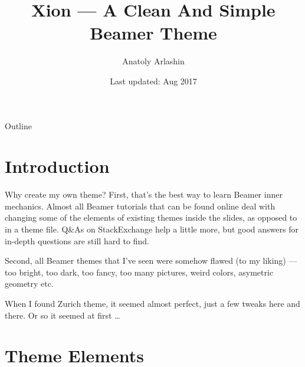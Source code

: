 \documentclass[11pt,c]{beamer}
\title{Xion --- A Clean And Simple Beamer Theme}
\author{Anatoly Arlashin}
\date{\footnotesize Last updated: Aug 2017}
\begin{document}
\begin{frame}[plain] %
	\titlepage
\end{frame}

\begin{frame}{Outline}
	\tableofcontents
\end{frame}

\section{Introduction}
	\begin{frame}{Why create my own theme?}
		\justifying	
		First, that's the best way to learn Beamer inner mechanics. Almost all Beamer tutorials that can be found online deal with changing some of the elements of existing themes inside the slides, as opposed to in a theme file. Q\&As on StackExchange help a little more, but good answers for in-depth questions are still hard to find.
		
		\bigskip
		Second, all Beamer themes that I've seen were somehow flawed (to my liking) --- too bright, too dark, too fancy, too many pictures, weird colors, asymetric geometry etc. 
		
		\bigskip
		When I found Zurich theme, it seemed almost perfect, just a few tweaks here and there. Or so it seemed at first \ldots
	\end{frame}

\section{Theme Elements}
\end{document}
